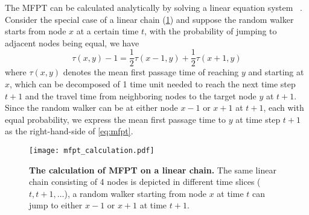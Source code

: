 The MFPT can be calculated analytically by solving a linear equation system~%
\citep{Kampen2007,Weber2010}. Consider the special case of a linear chain 
(\ref{fig:mfpt_calculation}) and suppose the random walker starts from node 
$x$ at a certain time $t$, with the probability of jumping to adjacent nodes
being equal, we have
\begin{equation}
\tau(x,y) - 1 = \frac{1}{2}\tau(x-1,y) + \frac{1}{2}\tau(x+1,y)
\label{eq:mfpt}
\end{equation}
where $\tau(x,y)$ denotes the mean first passage time of reaching $y$ and 
starting at $x$, which can be decomposed of 1 time unit needed to reach the
next time step $t+1$ and the travel time from neighboring nodes to the target node $y$ at $t+1$.
Since the random walker can be at either node $x-1$ or $x+1$ at $t+1$, each
with equal probability, we express the mean first passage time to $y$ at
time step $t+1$ as the right-hand-side of \ref{eq:mfpt}.

\begin{figure}[!ht]
\begin{center}
\texttt{[image: mfpt\_calculation.pdf]}
\end{center}
\caption[MFPT calculation]{
{\bf The calculation of MFPT on a linear chain.}
The same linear chain consisting of 4 nodes is depicted in different time 
slices ($t,t+1,\ldots$), 
a random walker starting from node $x$ at time $t$ can jump to either $x-1$ 
or $x+1$ at time $t+1$.
}
\label{fig:mfpt_calculation}
\end{figure}

